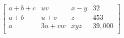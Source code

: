 \documentclass[12pt]{article}
\begin{document}
$$\left[
\begin{array} {clcr}  
a+b+c & uv & x-y & 32 \\  
a+b & u+v & z & 453\\  
a & 3u+vw & xyz & 39,000 \\
\end{array} \right] $$
\end{document}
